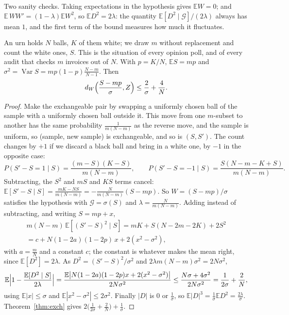 Two sanity checks. Taking expectations in the hypothesis gives $\mathbb EW=0$; and $\mathbb E\,WW'=(1-\lambda)\mathbb EW^2$, so $\mathbb ED^2=2\lambda$: the quantity
$\mathbb E[D^2\mid\mathcal G]/(2\lambda)$ always has mean $1$, and the first term of the bound measures how much it fluctuates.

\begin{example}\label{ex:hypergeom}
An urn holds $N$ balls, $K$ of them white; we draw $m$ without replacement and count the white ones, $S$. This is the situation of every opinion poll, and of
every audit that checks $m$ invoices out of $N$. With $p=K/N$, $\mathbb ES=mp$ and $\sigma^2=\operatorname{Var}S=mp(1-p)\frac{N-m}{N-1}$. Then
\[
d_W\Bigl(\frac{S-mp}\sigma,Z\Bigr)\le\frac2\sigma+\frac4N.
\]
\end{example}
\begin{proof}
Make the exchangeable pair by swapping a uniformly chosen ball of the sample with a uniformly chosen ball outside it. This move from one $m$-subset to
another has the same probability $\frac1{m(N-m)}$ as the reverse move, and the sample is uniform, so (sample, new sample) is exchangeable, and so is $(S,S')$.
The count changes by $+1$ if we discard a black ball and bring in a white one, by $-1$ in the opposite case:
\[
P(S'-S=1\mid S)=\frac{(m-S)(K-S)}{m(N-m)},\qquad P(S'-S=-1\mid S)=\frac{S(N-m-K+S)}{m(N-m)}.
\]
Subtracting, the $S^2$ and $mS$ and $KS$ terms cancel: $\mathbb E[S'-S\mid S]=\frac{mK-NS}{m(N-m)}=-\frac N{m(N-m)}(S-mp)$. So
$W=(S-mp)/\sigma$ satisfies the hypothesis with $\mathcal G=\sigma(S)$ and $\lambda=\frac N{m(N-m)}$. Adding instead of subtracting, and writing $S=mp+x$,
\[
\begin{gathered}
m(N-m)\,\mathbb E[(S'-S)^2\mid S]=mK+S(N-2m-2K)+2S^2\\=c+N(1-2a)(1-2p)\,x+2(x^2-\sigma^2),
\end{gathered}
\]
with $a=\frac mN$ and a constant $c$; the constant is whatever makes the mean right, since $\mathbb E[D^2]=2\lambda$. As $D^2=(S'-S)^2/\sigma^2$ and $2\lambda m(N-m)\sigma^2=2N\sigma^2$,
\[
\mathbb E\Bigl|1-\frac{\mathbb E[D^2\mid S]}{2\lambda}\Bigr|=\frac{\mathbb E\bigl|N(1-2a)(1-2p)x+2(x^2-\sigma^2)\bigr|}{2N\sigma^2}\le\frac{N\sigma+4\sigma^2}{2N\sigma^2}=\frac1{2\sigma}+\frac2N,
\]
using $\mathbb E|x|\le\sigma$ and $\mathbb E|x^2-\sigma^2|\le2\sigma^2$. Finally $|D|$ is $0$ or $\frac1\sigma$, so $\mathbb E|D|^3=\frac1\sigma\mathbb ED^2=\frac{2\lambda}\sigma$.
Theorem~\ref{thm:exch} gives $2\bigl(\frac1{2\sigma}+\frac2N\bigr)+\frac1\sigma$.
\end{proof}

